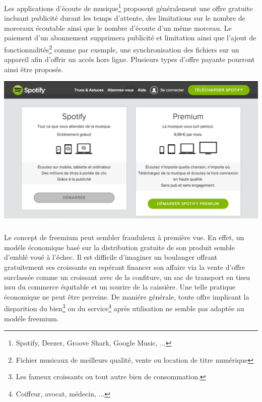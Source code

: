 \documentclass[11pt, a4paper ]{article}
\begin{document}
\begin{spacing}{1.5}
\subsubparagraph{}
Les applications d'écoute de musique\footnote{Spotify, Deezer, Groove Shark, Google Music, ...} proposent généralement une offre gratuite incluant publicité durant les temps d'attente, des limitations sur le nombre de morceaux écoutable ainsi que le nombre d'écoute d'un même morceau.
Le paiement d'un abonnement supprimera publicité et limitation ainsi que l'ajout de fonctionnalités\footnote{Fichier musicaux de meilleurs qualité, vente ou location de titre numérique} comme par exemple, une synchronisation des fichiers sur un appareil afin d'offrir un accés hors ligne. Plusieurs types d'offre payante pourront ainsi être proposés.


\begin{center}
	\includegraphics[width=\textwidth]{images/media/premiumSpotify.png}
\end{center}

\paragraph{} %
	\subparagraph{} %
Le concept de freemium peut sembler frauduleux à première vue. En effet, un modéle économique basé sur la distribution gratuite de son produit semble d'emblé voué à l'échec. Il est difficile d'imaginer un boulanger offrant gratuitement ses croissants en espérant financer son affaire via la vente d'offre surclassée comme un croissant avec de la confiture, un sac de transport en tissu issu du commerce équitable et un sourire de la caissière. Une telle pratique économique ne peut être perreine. De maniére générale, toute offre implicant la disparition du bien\footnote{Les fameux croissants ou tout autre bien de consommation.} ou du service\footnote{Coiffeur, avocat, médecin, ...} après utilisation ne semble pas adaptée au modéle freemium.


\end{spacing}
\end{document}
